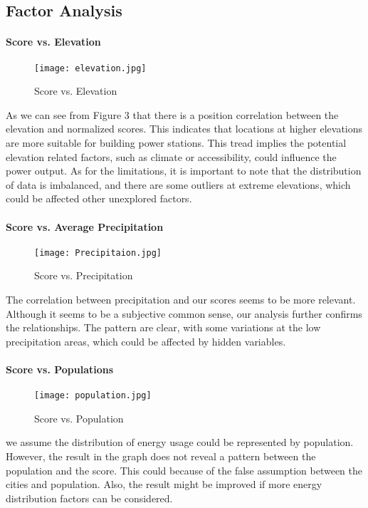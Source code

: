 \documentclass[11pt]{article}
\begin{document}
\subsection{Factor Analysis}
\paragraph{Score vs. Elevation}
\begin{figure}
\texttt{[image: elevation.jpg]}
\caption{Score vs. Elevation}
\label{fig:Fig3}
\end{figure}
As we can see from Figure 3 that there is a position correlation between the elevation and normalized scores. This indicates that locations at higher elevations are more suitable for building power stations. This tread implies the potential elevation related factors, such as climate or accessibility, could influence the power output. As for the limitations, it is important to note that the distribution of data is imbalanced, and there are some outliers at extreme elevations, which could be affected other unexplored factors.
\paragraph{Score vs. Average Precipitation}
\begin{figure}[!h]
\texttt{[image: Precipitaion.jpg]}
\caption{Score vs. Precipitation}
\label{fig:Fig4}
\end{figure}
The correlation between precipitation and our scores seems to be more relevant. Although it seems to be a subjective common sense, our analysis further confirms the relationships. The pattern are clear, with some variations at the low precipitation areas, which could be affected by hidden variables.
\paragraph{Score vs. Populations}
\begin{figure}[!h]
\texttt{[image: population.jpg]}
\caption{Score vs. Population}
\label{fig:Fig5}
\end{figure}
we assume the distribution of energy usage could be represented by population. However, the result in the graph does not reveal a pattern between the population and the score. This could because of the false assumption between the cities and population. Also, the result might be improved if more energy distribution factors can be considered.
\end{document}
